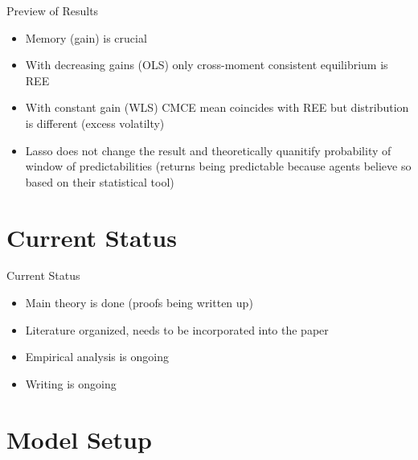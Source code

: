 \documentclass[compress,12pt]{beamer}
\begin{document}
\begin{frame}{Preview of Results}
\begin{itemize}
    \item Memory (gain) is crucial
    \item With decreasing gains (OLS) only cross-moment consistent equilibrium is REE 
    \item With constant gain (WLS) CMCE mean coincides with REE but distribution is different (excess volatilty)
    \item Lasso does not change the result and theoretically quanitify probability of window of predictabilities (returns being predictable because agents believe so based on their statistical tool)

\end{itemize}
\end{frame}

\section{Current Status}

\begin{frame}{Current Status}

\begin{itemize}
    \item Main theory is done (proofs being written up)
    \item Literature organized, needs to be incorporated into the paper
    \item Empirical analysis is ongoing
    \item Writing is ongoing
\end{itemize}

\end{frame}

\section{Model Setup}

\end{document}
